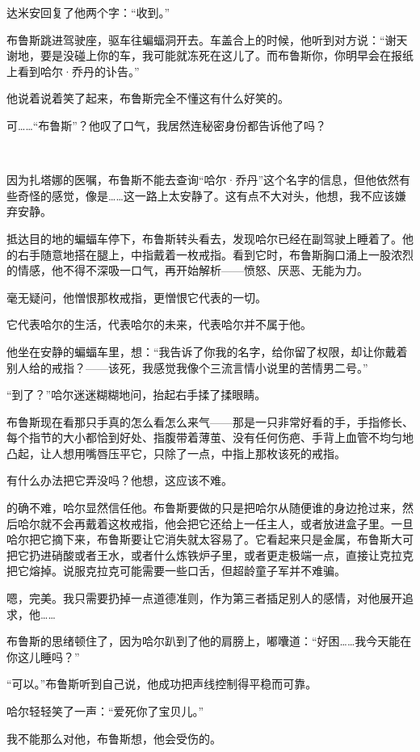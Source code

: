\documentclass[../main.tex]{subfiles}
\begin{document}
达米安回复了他两个字：“收到。”

布鲁斯跳进驾驶座，驱车往蝙蝠洞开去。车盖合上的时候，他听到对方说：“谢天谢地，要是没碰上你的车，我可能就冻死在这儿了。而布鲁斯你，你明早会在报纸上看到哈尔·乔丹的讣告。”

他说着说着笑了起来，布鲁斯完全不懂这有什么好笑的。

可……“布鲁斯”？他叹了口气，我居然连秘密身份都告诉他了吗？

~\

因为扎塔娜的医嘱，布鲁斯不能去查询“哈尔·乔丹”这个名字的信息，但他依然有些奇怪的感觉，像是……这一路上太安静了。这有点不大对头，他想，我不应该嫌弃安静。

抵达目的地的蝙蝠车停下，布鲁斯转头看去，发现哈尔已经在副驾驶上睡着了。他的右手随意地搭在腿上，中指戴着一枚戒指。看到它时，布鲁斯胸口涌上一股浓烈的情感，他不得不深吸一口气，再开始解析——愤怒、厌恶、无能为力。

毫无疑问，他憎恨那枚戒指，更憎恨它代表的一切。

它代表哈尔的生活，代表哈尔的未来，代表哈尔并不属于他。

他坐在安静的蝙蝠车里，想：“我告诉了你我的名字，给你留了权限，却让你戴着别人给的戒指？——该死，我感觉我像个三流言情小说里的苦情男二号。”

“到了？”哈尔迷迷糊糊地问，抬起右手揉了揉眼睛。

布鲁斯现在看那只手真的怎么看怎么来气——那是一只非常好看的手，手指修长、每个指节的大小都恰到好处、指腹带着薄茧、没有任何伤疤、手背上血管不均匀地凸起，让人想用嘴唇压平它，只除了一点，中指上那枚该死的戒指。

有什么办法把它弄没吗？他想，这应该不难。

的确不难，哈尔显然信任他。布鲁斯要做的只是把哈尔从随便谁的身边抢过来，然后哈尔就不会再戴着这枚戒指，他会把它还给上一任主人，或者放进盒子里。一旦哈尔把它摘下来，布鲁斯要让它消失就太容易了。它看起来只是金属，布鲁斯大可把它扔进硝酸或者王水，或者什么炼铁炉子里，或者更走极端一点，直接让克拉克把它熔掉。说服克拉克可能需要一些口舌，但超龄童子军并不难骗。

嗯，完美。我只需要扔掉一点道德准则，作为第三者插足别人的感情，对他展开追求，他……

布鲁斯的思绪顿住了，因为哈尔趴到了他的肩膀上，嘟囔道：“好困……我今天能在你这儿睡吗？”

“可以。”布鲁斯听到自己说，他成功把声线控制得平稳而可靠。

哈尔轻轻笑了一声：“爱死你了宝贝儿。”

我不能那么对他，布鲁斯想，他会受伤的。
\end{document}
